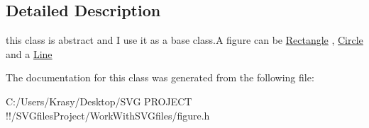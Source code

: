 \subsection{Detailed Description}
this class is abstract and I use it as a base class.\+A figure can be \mbox{\hyperlink{class_rectangle}{Rectangle}} , \mbox{\hyperlink{class_circle}{Circle}} and a \mbox{\hyperlink{class_line}{Line}} 

The documentation for this class was generated from the following file\+:\begin{DoxyCompactItemize}
\item 
C\+:/\+Users/\+Krasy/\+Desktop/\+S\+V\+G P\+R\+O\+J\+E\+C\+T !!/\+S\+V\+Gfiles\+Project/\+Work\+With\+S\+V\+Gfiles/figure.\+h\end{DoxyCompactItemize}

